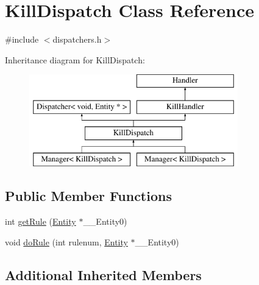 \hypertarget{class_kill_dispatch}{\section{Kill\-Dispatch Class Reference}
\label{class_kill_dispatch}
}


{\ttfamily \#include $<$dispatchers.\-h$>$}

Inheritance diagram for Kill\-Dispatch\-:\begin{figure}[H]
\begin{center}
\leavevmode
\includegraphics[height=4.000000cm]{class_kill_dispatch}
\end{center}
\end{figure}
\subsection*{Public Member Functions}
\begin{DoxyCompactItemize}
\item 
int \hyperlink{class_kill_dispatch_a3dabfd881b5b70d04048469f6161e8b2}{get\-Rule} (\hyperlink{class_entity}{Entity} $\ast$\-\_\-\-\_\-\-Entity0)
\item 
void \hyperlink{class_kill_dispatch_a77dc8cd9a45c9753fe2efdbd1080e721}{do\-Rule} (int rulenum, \hyperlink{class_entity}{Entity} $\ast$\-\_\-\-\_\-\-Entity0)
\end{DoxyCompactItemize}
\subsection*{Additional Inherited Members}


